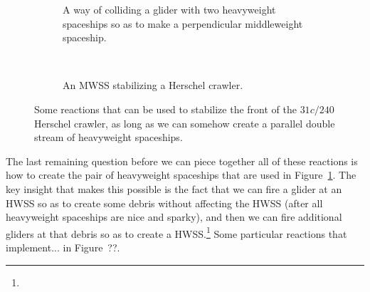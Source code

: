 \begin{figure}[!htb]
	\centering
	\begin{subfigure}[b]{0.43\textwidth}
		\centering
		\caption{A way of colliding a glider with two heavyweight spaceships so as to make a perpendicular middleweight spaceship.}\label{fig:g_2h_to_m}
	\end{subfigure} \ \	\ \ \begin{subfigure}[b]{0.53\textwidth}
		\centering
		\caption{An MWSS stabilizing a Herschel crawler.}\label{fig:herschel_mwss_stabilize}
	\end{subfigure}
	\caption{Some reactions that can be used to stabilize the front of the $31c/240$ Herschel crawler, as long as we can somehow create a parallel double stream of heavyweight spaceships.}\label{fig:silverfish_mwss_reactions}
\end{figure}


The last remaining question before we can piece together all of these reactions is how to create the pair of heavyweight spaceships that are used in Figure~\ref{fig:g_2h_to_m}. The key insight that makes this possible is the fact that we can fire a glider at an HWSS so as to create some debris without affecting the HWSS (after all heavyweight spaceships are nice and sparky), and then we can fire additional gliders at that debris so as to create a HWSS.\footnote{} Some particular reactions that implement... in Figure~??.%

%
%

